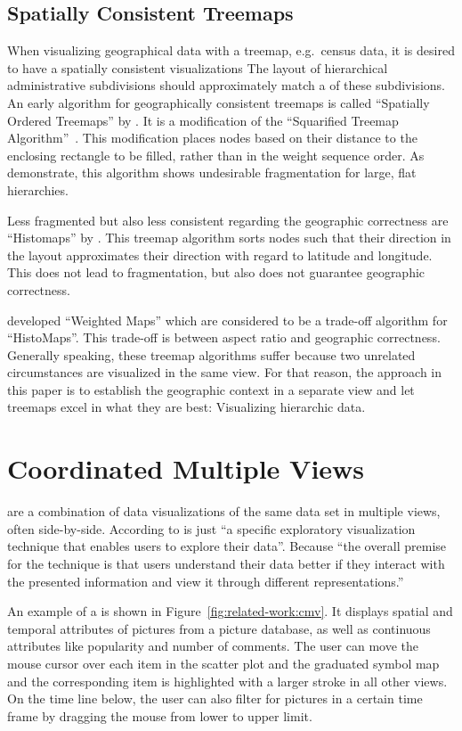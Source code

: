 \subsection{Spatially Consistent Treemaps}
When visualizing geographical data with a treemap, e.g.\ census data, it is desired to have a spatially consistent visualizations
The layout of hierarchical administrative subdivisions should approximately match a \gv{} of these subdivisions.
An early algorithm for geographically consistent treemaps is called ``Spatially Ordered Treemaps'' by \textcite{Wood2008}.
It is a modification of the ``Squarified Treemap Algorithm''~\cite{Bruls2000}.
This modification places nodes based on their distance to the enclosing rectangle to be filled, rather than in the weight sequence order.
As \textcite{Ghoniem2015} demonstrate, this algorithm shows undesirable fragmentation for large, flat hierarchies.

Less fragmented but also less consistent regarding the geographic correctness are ``Histomaps'' by \textcite{Keim2002}.
This treemap algorithm sorts nodes such that their direction in the layout approximates their direction with regard to latitude and longitude.
This does not lead to fragmentation, but also does not guarantee geographic correctness.

\textcite{Ghoniem2015} developed ``Weighted Maps'' which are considered to be a trade-off algorithm for ``HistoMaps''.
This trade-off is between aspect ratio and geographic correctness.
Generally speaking, these treemap algorithms suffer because two unrelated circumstances are visualized in the same view.
For that reason, the approach in this paper is to establish the geographic context in a separate view and let treemaps excel in what they are best:
Visualizing hierarchic data.


\section{Coordinated Multiple Views}\label{sec:related-work:cmvs}
\cmvs{} are a combination of data visualizations of the same data set in multiple views, often side-by-side.
According to \textcite{Roberts2007} \cmvs{} is just ``a specific exploratory visualization technique that enables users to explore their data''.
Because ``the overall premise for the technique is that users understand their data better if they interact with the presented information and view it through different representations.''~\parencite{Roberts2007}

An example of a \cmv{} is shown in Figure~\ref{fig:related-work:cmv}.
It displays spatial and temporal attributes of pictures from a picture database, as well as continuous attributes like popularity and number of comments.
The user can move the mouse cursor over each item in the scatter plot and the graduated symbol map and the corresponding item is highlighted with a larger stroke in all other views.
On the time line below, the user can also filter for pictures in a certain time frame by dragging the mouse from lower to upper limit.

